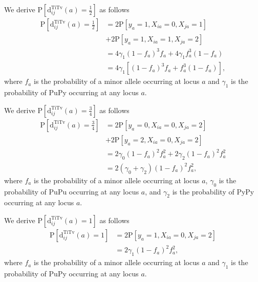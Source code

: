 \documentclass[10pt,letterpaper]{article}
\begin{document}
We derive $\text{P}\left[\text{d}^\text{TiTv}_{ij}(a) = \frac{1}{2}\right]$ as follows
%
\begin{equation}\label{eq:prob_TiTv_0.5}
\begin{aligned}
\text{P}\left[\text{d}^\text{TiTv}_{ij}(a) = \frac{1}{2}\right] &= 2 \text{P}\left[y_a = 1, X_{ia} = 0, X_{ja} = 1\right] \\
&+ 2 \text{P}\left[y_a = 1, X_{ia} = 1, X_{ja} = 2\right] \\
&= 4 \gamma_1 (1 - f_a)^3 f_a + 4 \gamma_1 f^3_a (1 - f_a) \\
&= 4 \gamma_1 \left[(1 - f_a)^3 f_a + f^3_a (1 - f_a)\right],
\end{aligned}
\end{equation}
%
where $f_a$ is the probability of a minor allele occurring at locus $a$ and $\gamma_1$ is the probability of PuPy occurring at any locus $a$.

We derive $\text{P}\left[\text{d}^\text{TiTv}_{ij}(a) = \frac{3}{4}\right]$ as follows
%
\begin{equation}\label{eq:prob_TiTv_0.75}
\begin{aligned}
\text{P}\left[\text{d}^\text{TiTv}_{ij}(a) = \frac{3}{4}\right] &= 2 \text{P}\left[y_a = 0, X_{ia} = 0, X_{ja} = 2\right] \\
&+ 2 \text{P}\left[y_a = 2, X_{ia} = 0, X_{ja} = 2\right] \\
&= 2 \gamma_0 (1 - f_a)^2 f^2_a + 2 \gamma_2 (1 - f_a)^2 f^2_a \\
&= 2(\gamma_0 + \gamma_2)(1 - f_a)^2 f^2_a,
\end{aligned}
\end{equation}
%
where $f_a$ is the probability of a minor allele occurring at locus $a$, $\gamma_0$ is the probability of PuPu occurring at any locus $a$, and $\gamma_2$ is the probability of PyPy occurring at any locus $a$.

We derive $\text{P}\left[\text{d}^\text{TiTv}_{ij}(a) = 1\right]$ as follows
%
\begin{equation}\label{eq:prob_TiTv_1}
\begin{aligned}
\text{P}\left[\text{d}^\text{TiTv}_{ij}(a) = 1\right] &= 2 \text{P}\left[y_a = 1, X_{ia} = 0, X_{ja} = 2\right] \\
&= 2 \gamma_1 (1 - f_a)^2 f^2_a,
\end{aligned}
\end{equation}
%
where $f_a$ is the probability of a minor allele occurring at locus $a$ and $\gamma_1$ is the probability of PuPy occurring at any locus $a$.
\end{document}
